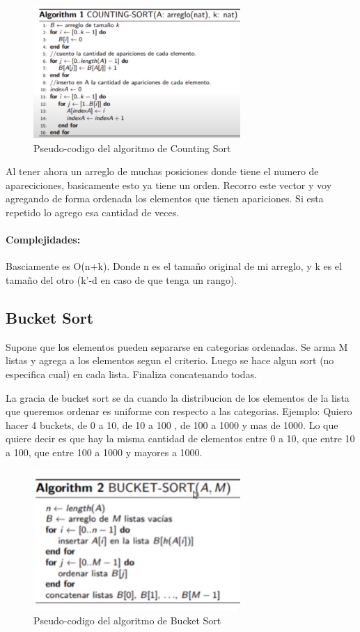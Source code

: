 \documentclass[11pt]{article}
\begin{document}
\begin{figure}[h!]
    \centering
    \includegraphics[width=0.7\textwidth]{countingSort.png}
    \caption{Pseudo-codigo del algoritmo de Counting Sort}
    \label{fig:counting}
\end{figure}

Al tener ahora un arreglo de muchas posiciones donde tiene el
numero de apareciciones, basicamente esto ya tiene un orden.
Recorro este vector y voy agregando de forma ordenada los elementos que
tienen apariciones.
Si esta repetido lo agrego esa cantidad de veces.

\paragraph{Complejidades:}
Basciamente es O(n+k).
Donde n es el tama\~no original de mi arreglo, y k es el
tama\~no del otro (k'-d en caso de que tenga un rango).

\subsection{Bucket Sort}
Supone que los elementos pueden separarse en categorias ordenadas.
Se arma M listas y agrega a los elementos segun el criterio.
Luego se hace algun sort (no especifica cual) en cada lista.
Finaliza concatenando todas.

La gracia de bucket sort se da cuando la distribucion de los elementos
de la lista que queremos ordenar es uniforme con respecto a las categorias.
Ejemplo:
Quiero hacer 4 buckets, de 0 a 10, de 10 a 100 , de 100 a 1000 y mas de 1000.
Lo que quiere decir es que hay la misma cantidad de elementos entre
0 a 10, que entre 10 a 100,  que entre 100 a 1000 y mayores a 1000.

\begin{figure}[h!]
    \centering
    \includegraphics[width=0.7\textwidth]{bucketSort.png}
    \caption{Pseudo-codigo del algoritmo de Bucket Sort}
    \label{fig:bucket}
\end{figure}
\end{document}
